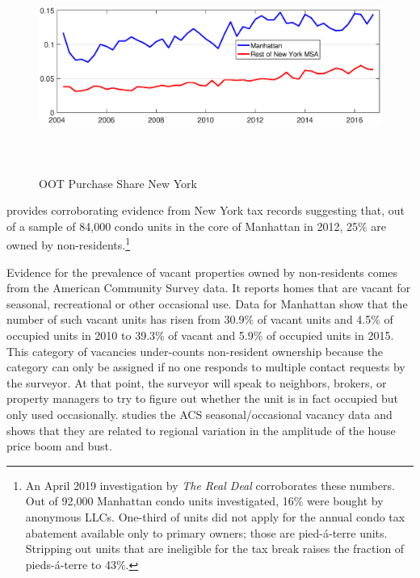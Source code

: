 \documentclass[letterpaper,12pt,dvipsnames,usenames]{article}
\theoremstyle{definition}
\begin{document}
\begin{spacing}{1.25}
\begin{figure}[h]
\caption{OOT Purchase Share New York}\label{Fig:OOTshareNY}
\vspace{-0.5cm}
\begin{center}
\includegraphics[width=5.5in,height=2.75in]{../Figures/OOTNY_v2}
\end{center}
\end{figure}

\citet{suher} provides corroborating evidence from New York tax records suggesting that, out of a sample of 84,000 condo units in the core of Manhattan in 2012, 25\% are owned by non-residents.\footnote{An April 2019 investigation by \emph{The Real Deal} corroborates these numbers. Out of 92,000 Manhattan condo units investigated, 16\% were bought by anonymous LLCs. One-third of units did not apply for the annual condo tax abatement available only to primary owners; those are pied-\'a-terre units. Stripping out units that are ineligible for the tax break raises the fraction of pieds-\'a-terre to 43\%.}

Evidence for the prevalence of vacant properties owned by non-residents comes from the American Community Survey data. It reports homes that are vacant for seasonal, recreational or other occasional use. Data for Manhattan show that the number of such vacant units has risen from 30.9\% of vacant units and 4.5\% of occupied units in 2010 to 39.3\% of vacant and 5.9\% of occupied units in 2015. This category of vacancies under-counts non-resident ownership because the category can only be assigned if no one responds to multiple contact requests by the surveyor. At that point, the surveyor will speak to neighbors, brokers, or property managers to try to figure out whether the unit is in fact occupied but only used occasionally. \citet{wheaton17} studies the ACS seasonal/occasional vacancy data and shows that they are related to regional variation in the amplitude of the house price boom and bust.


\end{spacing}
\end{document}
